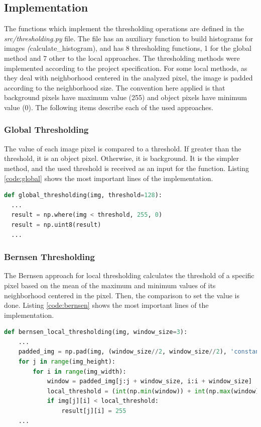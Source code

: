 \documentclass[]{IEEEtran}
\begin{document}
\subsection{Implementation}
The functions which implement the thresholding operations are defined in the \textit{src/thresholding.py} file. The file has an auxiliary function to build histograms for images \textit(calculate\_histogram), and has 8 thresholding functions, 1 for the global method and 7 other to the local approaches. The thresholding methods were implemented according to the project specification. For some local methods, as they deal with neighborhood centered in the analyzed pixel, the image is padded according to the neighborhood size. The convention here applied is that background pixels have maximum value (255) and object pixels have minimum value (0). The following items describe each of the used approaches.

\subsubsection{Global Thresholding}
The value of each image pixel is compared to a threshold. If greater than the threshold, it is an object pixel. Otherwise, it is background. It is the simpler method, and the used threshold is received as an input for the function. Listing \ref{code:global} shows the most important lines of the implementation.

\begin{lstlisting}[language=Python, caption={Global Thresholding Implementation}, label={code:global}]
def global_thresholding(img, threshold=128):
  ...
  result = np.where(img < threshold, 255, 0)
  result = np.uint8(result)
  ...
\end{lstlisting}

\subsubsection{Bernsen Thresholding}
The Bernsen approach for local thresholding calculates the threshold of a specific pixel based on the mean of the maximum and minimum values of its neighborhood centered in the pixel. Then, the comparison to set the value is done. Listing \ref{code:bernsen} shows the most important lines of the implementation.

\begin{lstlisting}[language=Python, caption={Bernsen Local Thresholding Implementation}, label={code:bernsen}]
  def bernsen_local_thresholding(img, window_size=3):
    ...
    padded_img = np.pad(img, (window_size//2, window_size//2), 'constant')
    for j in range(img_height):
        for i in range(img_width):
            window = padded_img[j:j + window_size, i:i + window_size]
            local_threshold = (int(np.min(window)) + int(np.max(window)))//2
            if img[j][i] < local_threshold:
                result[j][i] = 255
    ...
\end{lstlisting}
\end{document}
